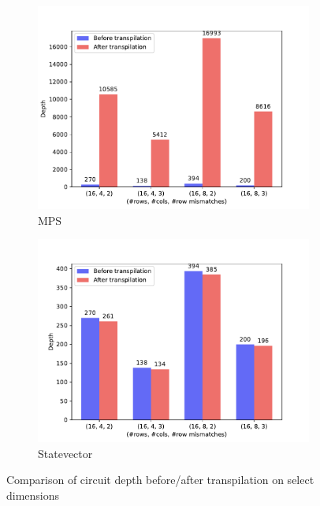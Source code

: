 \documentclass[11pt]{article}
\theoremstyle{definition}
\theoremstyle{remark}
\begin{document}
\begin{figure}[h!]
  \begin{subfigure}{0.48\textwidth}
    \includegraphics[width=\textwidth]{../results/figures/circuit_depth_before_after_transpilation-MPS.pdf}
    \caption{MPS}
  \end{subfigure}
  \begin{subfigure}{0.48\textwidth}
    \includegraphics[width=\textwidth]{../results/figures/circuit_depth_before_after_transpilation-statevector_cpu.pdf}
    \caption{Statevector}
  \end{subfigure}
  \caption{Comparison of circuit depth before/after transpilation on select
  dimensions}
  \label{fig:circuit_depth_before_after}
\end{figure}
\end{document}
